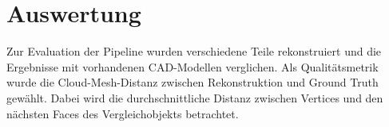 
\chapter{Auswertung}
\label{ch:auswertung}

Zur Evaluation der Pipeline wurden verschiedene Teile rekonstruiert und die Ergebnisse mit vorhandenen CAD-Modellen verglichen.
Als Qualitätsmetrik wurde die Cloud-Mesh-Distanz zwischen Rekonstruktion und Ground Truth gewählt.
Dabei wird die durchschnittliche Distanz zwischen Vertices und den nächsten Faces des Vergleichobjekts betrachtet.


